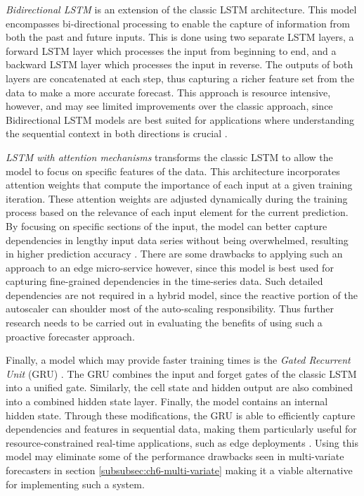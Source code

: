 \textit{Bidirectional LSTM} \cite{graves2005framewise} is an extension of the classic LSTM architecture. This model encompasses bi-directional processing to enable the capture of information from both the past and future inputs. This is done using two separate LSTM layers, a forward LSTM layer which processes the input from beginning to end, and a backward LSTM layer which processes the input in reverse. The outputs of both layers are concatenated at each step, thus capturing a richer feature set from the data to make a more accurate forecast. This approach is resource intensive, however, and may see limited improvements over the classic approach, since Bidirectional LSTM models are best suited for applications where understanding the sequential context in both directions is crucial \cite{breuel2015benchmarking}.\par

\textit{LSTM with attention mechanisms} \cite{zheng2021understanding} transforms the classic LSTM to allow the model to focus on specific features of the data. This architecture incorporates attention weights that compute the importance of each input at a given training iteration. These attention weights are adjusted dynamically during the training process based on the relevance of each input element for the current prediction. By focusing on specific sections of the input, the model can better capture dependencies in lengthy input data series without being overwhelmed, resulting in higher prediction accuracy \cite{zhou2020comparison}. There are some drawbacks to applying such an approach to an edge micro-service however, since this model is best used for capturing fine-grained dependencies in the time-series data. Such detailed dependencies are not required in a hybrid model, since the reactive portion of the autoscaler can shoulder most of the auto-scaling responsibility. Thus further research needs to be carried out in evaluating the benefits of using such a proactive forecaster approach.\par

Finally, a model which may provide faster training times is the \textit{Gated Recurrent Unit} (GRU) \cite{chung2014empirical}. The GRU combines the input and forget gates of the classic LSTM into a unified gate. Similarly, the cell state and hidden output are also combined into a combined hidden state layer. Finally, the model contains an internal hidden state. Through these modifications, the GRU is able to efficiently capture dependencies and features in sequential data, making them particularly useful for resource-constrained real-time applications, such as edge deployments \cite{yang2020lstm}. Using this model may eliminate some of the performance drawbacks seen in multi-variate forecasters in section \ref{subsubsec:ch6-multi-variate} making it a viable alternative for implementing such a system.\par